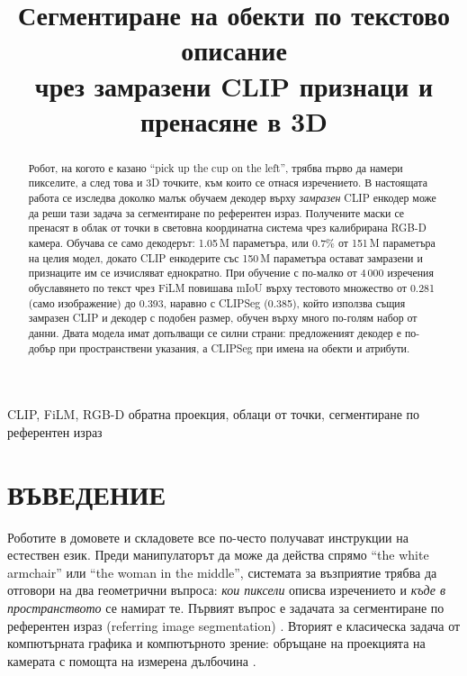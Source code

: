 \documentclass[conference,a4paper]{IEEEtran}
\newcommand{\bgsc}[2]{\texorpdfstring{#1{\footnotesize\MakeUppercase{#2}}}{#1#2}}
\newcommand{\en}[1]{\enquote{#1}}
\begin{document}
\title{Сегментиране на обекти по текстово описание\\чрез замразени CLIP признаци и пренасяне в 3D}

\author{
}

\maketitle

\begin{abstract}
Робот, на когото е казано \en{pick up the cup on the left}, трябва първо да намери пикселите, а след
това и 3D точките, към които се отнася изречението. В настоящата работа се изследва доколко малък
обучаем декодер върху \emph{замразен} CLIP енкодер може да реши тази задача за сегментиране по
референтен израз. Получените маски се пренасят в облак от точки в световна координатна система чрез
калибрирана RGB-D камера. Обучава се само декодерът: 1.05\,M параметъра, или 0.7\% от 151\,M
параметъра на целия модел, докато CLIP енкодерите със 150\,M параметъра остават замразени и
признаците им се изчисляват еднократно. При обучение с по-малко от 4\,000 изречения обуславянето по
текст чрез FiLM повишава mIoU върху тестовото множество от 0.281 (само изображение) до 0.393,
наравно с CLIPSeg (0.385), който използва същия замразен CLIP и декодер с подобен размер, обучен
върху много по-голям набор от данни. Двата модела имат допълващи се силни страни:
предложеният декодер е по-добър при пространствени указания, а CLIPSeg при имена на обекти и
атрибути.
\end{abstract}

\begin{IEEEkeywords}
CLIP, FiLM, RGB-D обратна проекция, облаци от точки, сегментиране по референтен израз
\end{IEEEkeywords}

\section{\bgsc{В}{ъведение}}
\label{sec:introduction}

Роботите в домовете и складовете все по-често получават инструкции на естествен език. Преди
манипулаторът да може да действа спрямо \en{the white armchair} или \en{the woman in the middle},
системата за възприятие трябва да отговори на два геометрични въпроса: \emph{кои пиксели} описва
изречението и \emph{къде в пространството} се намират те. Първият въпрос е задачата за сегментиране
по референтен израз (referring image segmentation) \cite{hu2016segmentation}. Вторият е класическа
задача от компютърната графика и компютърното зрение: обръщане на проекцията на камерата с помощта
на измерена дълбочина \cite{hartley2004mvg}.
\end{document}
